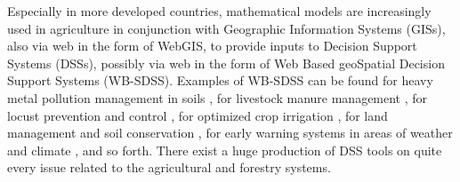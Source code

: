 \documentclass[authoryear,preprint,review,12pt]{elsarticle}
\newcommand{\note}[1]{\emph{\textcolor{red}{#1}}}
\newcommand{\review}[1]{\emph{\textcolor{cyan}{#1}}}
\begin{document}
Especially in more developed countries, mathematical models are increasingly used in agriculture in conjunction with Geographic Information Systems (GISs), also via web in the form of WebGIS, to provide inputs to Decision Support Systems (DSSs), possibly via web in the form of Web Based geoSpatial Decision Support Systems (WB-SDSS).
Examples of WB-SDSS can be found 
for heavy metal pollution management in soils \citep{Wang:wbsdss:2017}, 
for livestock manure management \citep{Acutis:wbsdss:2014}, 
for locust prevention and control \citep{Yao:wbsdss:2017}, 
for optimized crop irrigation \citep{Giusti:wbsdss:2015}, 
for land management and soil conservation \citep{Terribile:LandSupport:2024}, 
for early warning systems in areas of weather and climate \citep{Bopape_2019},
and so forth.
There exist a huge production of DSS tools on quite every issue related to the agricultural and forestry systems.
\end{document}
